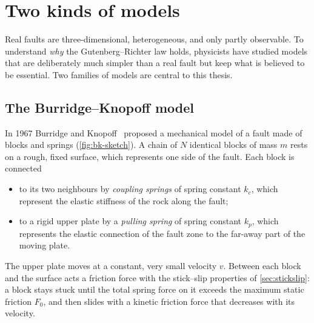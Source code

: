 \section{Two kinds of models}
\label{sec:models}

Real faults are three-dimensional, heterogeneous, and only partly observable. To understand
\emph{why} the Gutenberg--Richter law holds, physicists have studied models that are deliberately
much simpler than a real fault but keep what is believed to be essential. Two families of models
are central to this thesis.

\subsection{The Burridge--Knopoff model}
\label{sec:bk-intro}

In 1967 Burridge and Knopoff~\cite{BurridgeKnopoff1967} proposed a mechanical model of a fault made of
blocks and springs (\cref{fig:bk-sketch}). A chain of $N$ identical blocks of mass $m$ rests on a rough,
fixed surface, which represents one side of the fault. Each block is connected
\begin{itemize}[nosep]
  \item to its two neighbours by \emph{coupling springs} of spring constant $k_c$, which represent the
    elastic stiffness of the rock along the fault;
  \item to a rigid upper plate by a \emph{pulling spring} of spring constant $k_p$, which represents the
    elastic connection of the fault zone to the far-away part of the moving plate.
\end{itemize}
The upper plate moves at a constant, very small velocity $v$. Between each block and the surface acts
a friction force with the stick--slip properties of \cref{sec:stickslip}: a block stays stuck until the
total spring force on it exceeds the maximum static friction $F_0$, and then slides with a kinetic
friction force that decreases with its velocity.

